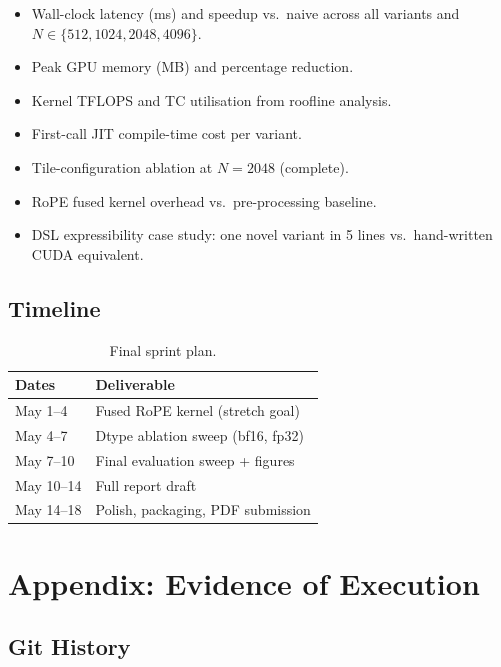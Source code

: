 \documentclass[12pt]{article}
\begin{document}
\begin{itemize}[leftmargin=1.5em,itemsep=0pt]
  \item Wall-clock latency (ms) and speedup vs.\ naive across all variants and
    $N \in \{512, 1024, 2048, 4096\}$.
  \item Peak GPU memory (MB) and percentage reduction.
  \item Kernel TFLOPS and TC utilisation from roofline analysis.
  \item First-call JIT compile-time cost per variant.
  \item Tile-configuration ablation at $N{=}2048$ (complete).
  \item RoPE fused kernel overhead vs.\ pre-processing baseline.
  \item DSL expressibility case study: one novel variant in 5 lines vs.\
    hand-written CUDA equivalent.
\end{itemize}

\subsection{Timeline}

\begin{table}[H]
\centering
\caption{Final sprint plan.}
\begin{tabular}{ll}
\toprule
\textbf{Dates} & \textbf{Deliverable} \\
\midrule
May 1--4  & Fused RoPE kernel (stretch goal) \\
May 4--7  & Dtype ablation sweep (bf16, fp32) \\
May 7--10 & Final evaluation sweep + figures \\
May 10--14 & Full report draft \\
May 14--18 & Polish, packaging, PDF submission \\
\bottomrule
\end{tabular}
\end{table}

\section{Appendix: Evidence of Execution}

\subsection{Git History}
\end{document}
